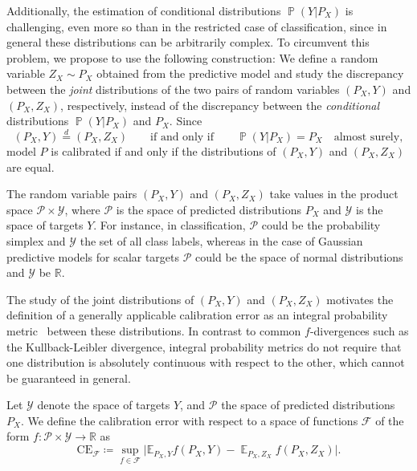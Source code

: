 \documentclass{article}
\DeclareMathOperator{\Prob}{\mathbb{P}}
\DeclareMathOperator{\Exp}{\mathbb{E}}
\begin{document}
Additionally, the estimation of 
conditional distributions $\Prob(Y|P_X)$ is challenging, even more so than in the
restricted case of classification, since in general these distributions can be
arbitrarily complex. To circumvent this problem, we propose to use the
following construction:
We define a random variable $Z_X \sim P_X$ obtained from the predictive model and study
 the discrepancy between the \emph{joint}
distributions of the two pairs of random variables $(P_X, Y)$ and $(P_X, Z_X)$, respectively,
instead of the discrepancy between the \emph{conditional} distributions
$\Prob(Y|P_X)$ and $P_X$. Since
\begin{equation*}
    (P_X, Y) \stackrel{d}{=} (P_X, Z_X) \qquad \text{if and only if}
    \qquad \Prob(Y|P_X) = P_X \quad \text{almost surely},
\end{equation*}
model $P$ is calibrated if and only if the distributions of $(P_X, Y)$
and $(P_X, Z_X)$ are equal.

The random variable pairs $(P_X, Y)$ and $(P_X, Z_X)$
take values in the product space $\mathcal{P} \times \mathcal{Y}$, where $\mathcal{P}$
is the space of predicted distributions $P_X$ and $\mathcal{Y}$ is the space of
targets $Y$. For instance, in classification, $\mathcal{P}$ could be the probability
simplex and $\mathcal{Y}$ the set of all class labels, whereas in the case of
Gaussian predictive models for scalar targets $\mathcal{P}$ could be the space of
normal distributions and $\mathcal{Y}$ be $\mathbb{R}$.

The study of the joint distributions of $(P_X, Y)$ and $(P_X, Z_X)$ motivates the
definition of a generally applicable calibration error as an integral probability
metric~\citep{Sriperumbudur2009,Sriperumbudur2012,Mueller1997} between these
distributions. In contrast to common $f$-divergences such as the Kullback-Leibler
divergence, integral probability metrics do not require that one distribution is
absolutely continuous with respect to the other, which cannot be guaranteed in general.

\begin{definitionboxed}\label{def:ce}
    Let $\mathcal{Y}$ denote the space of targets $Y$, and $\mathcal{P}$ the
    space of predicted distributions $P_X$.
    We define the calibration error with respect to a space of functions
    $\mathcal{F}$ of the form $f \colon \mathcal{P} \times \mathcal{Y} \to \mathbb{R}$
    as
    \begin{equation}\label{eq:calibrationerror}
        \mathrm{CE}_\mathcal{F} \coloneqq \sup_{f \in \mathcal{F}} \big| \mathbb{E}_{P_X, Y}{f(P_X, Y)} - \Exp_{P_X, Z_X} f(P_X, Z_X) \big|.
    \end{equation}
\end{definitionboxed}
\end{document}
